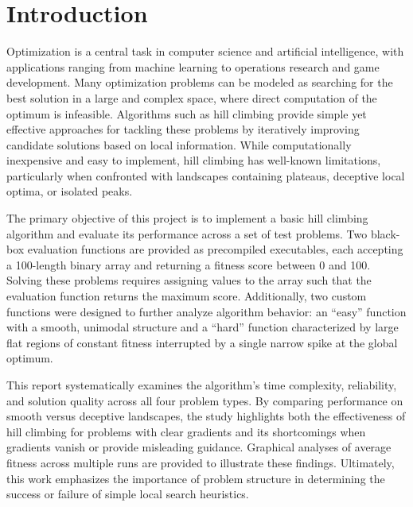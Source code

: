 \documentclass[11pt]{article}
\begin{document}
\noindent


\pagebreak

\section{Introduction}
\label{section-intro}

Optimization is a central task in computer science and artificial intelligence, with applications ranging from machine learning to operations research and game development. Many optimization problems can be modeled as searching for the best solution in a large and complex space, where direct computation of the optimum is infeasible. Algorithms such as hill climbing provide simple yet effective approaches for tackling these problems by iteratively improving candidate solutions based on local information. While computationally inexpensive and easy to implement, hill climbing has well-known limitations, particularly when confronted with landscapes containing plateaus, deceptive local optima, or isolated peaks.

The primary objective of this project is to implement a basic hill climbing algorithm and evaluate its performance across a set of test problems. Two black-box evaluation functions are provided as precompiled executables, each accepting a 100-length binary array and returning a fitness score between 0 and 100. Solving these problems requires assigning values to the array such that the evaluation function returns the maximum score. Additionally, two custom functions were designed to further analyze algorithm behavior: an “easy” function with a smooth, unimodal structure and a “hard” function characterized by large flat regions of constant fitness interrupted by a single narrow spike at the global optimum.

This report systematically examines the algorithm’s time complexity, reliability, and solution quality across all four problem types. By comparing performance on smooth versus deceptive landscapes, the study highlights both the effectiveness of hill climbing for problems with clear gradients and its shortcomings when gradients vanish or provide misleading guidance. Graphical analyses of average fitness across multiple runs are provided to illustrate these findings. Ultimately, this work emphasizes the importance of problem structure in determining the success or failure of simple local search heuristics.
\end{document}
